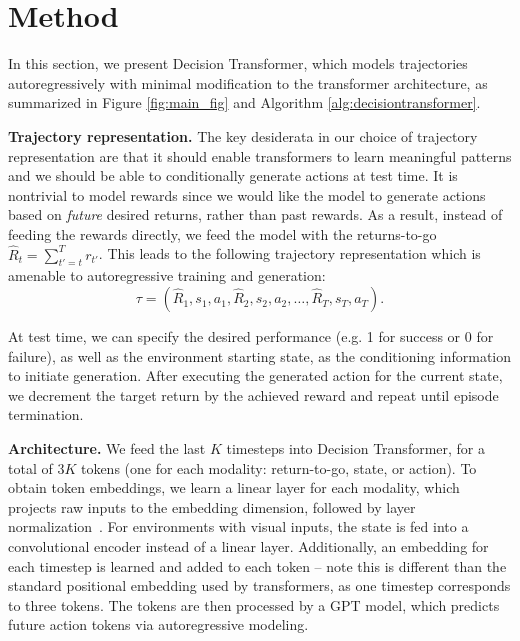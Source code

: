 
\section{Method} \label{section:method}

In this section, we present Decision Transformer, which models trajectories autoregressively with minimal modification to the transformer architecture, as summarized in Figure \ref{fig:main_fig} and Algorithm \ref{alg:decisiontransformer}.

\textbf{Trajectory representation.}
The key desiderata in our choice of trajectory representation are
that it should enable transformers to learn meaningful patterns and we should be able to conditionally generate actions at test time.
It is nontrivial to model rewards since we would like the model to generate actions based on \emph{future} desired returns, rather than past rewards.
As a result, instead of feeding the rewards directly, we feed the model with the returns-to-go $\widehat{R}_t = \sum_{t'=t}^T r_{t'}$.
This leads to the following trajectory representation which is amenable to autoregressive training and generation:
\begin{equation}
    \tau = \left(\widehat{R}_1, s_1, a_1, \widehat{R}_2, s_2, a_2, \dots, \widehat{R}_T, s_T, a_T\right).
\end{equation}

At test time, we can specify the desired performance (e.g. 1 for success or 0 for failure), as well as the environment starting state, as the conditioning information to initiate generation.
After executing the generated action for the current state, we decrement the target return by the achieved reward and repeat until episode termination.

\textbf{Architecture.}
We feed the last $K$ timesteps into Decision Transformer, for a total of $3K$ tokens (one for each modality: return-to-go, state, or action).
To obtain token embeddings, we learn a linear layer for each modality, which projects raw inputs to the embedding dimension, followed by layer normalization~\citep{ba2016layernorm}. 
For environments with visual inputs, the state is fed into a convolutional encoder instead of a linear layer.
Additionally, an embedding for each timestep is learned and added to each token -- note this is different than the standard positional embedding used by transformers, as one timestep corresponds to three tokens.
The tokens are then processed by a GPT \citep{radford2018gpt} model, which predicts future action tokens via autoregressive modeling.


